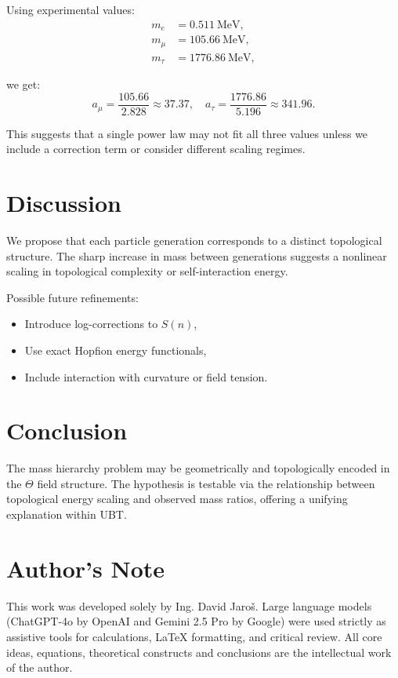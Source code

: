 \documentclass[12pt]{article}
\begin{document}
Using experimental values:
\begin{align*}
m_e &= 0.511~\text{MeV}, \\
m_\mu &= 105.66~\text{MeV}, \\
m_\tau &= 1776.86~\text{MeV},
\end{align*}

we get:
\[
a_\mu = \frac{105.66}{2.828} \approx 37.37,\quad
a_\tau = \frac{1776.86}{5.196} \approx 341.96.
\]

This suggests that a single power law may not fit all three values unless we include a correction term or consider different scaling regimes.

\section{Discussion}

We propose that each particle generation corresponds to a distinct topological structure. The sharp increase in mass between generations suggests a nonlinear scaling in topological complexity or self-interaction energy.

Possible future refinements:
\begin{itemize}
    \item Introduce log-corrections to $S(n)$,
    \item Use exact Hopfion energy functionals,
    \item Include interaction with curvature or field tension.
\end{itemize}

\section{Conclusion}

The mass hierarchy problem may be geometrically and topologically encoded in the $\Theta$ field structure. The hypothesis is testable via the relationship between topological energy scaling and observed mass ratios, offering a unifying explanation within UBT.


\section*{Author's Note}

This work was developed solely by Ing. David Jaroš.  
Large language models (ChatGPT-4o by OpenAI and Gemini 2.5 Pro by Google) were used strictly as assistive tools for calculations, LaTeX formatting, and critical review.  
All core ideas, equations, theoretical constructs and conclusions are the intellectual work of the author.
\end{document}
